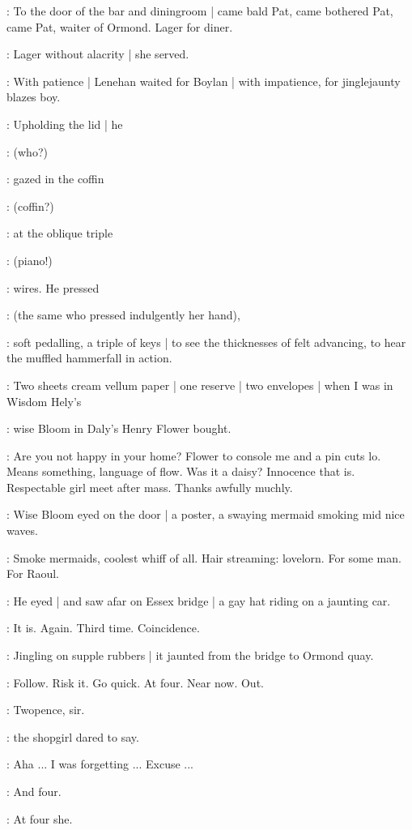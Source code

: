 :
To the door of the bar and diningroom |
came bald Pat,
came bothered Pat,
came Pat,
waiter of Ormond.
Lager for diner.

:
Lager without alacrity |
she served.

:
With patience  |
Lenehan waited for Boylan |
with impatience,
for jinglejaunty
blazes boy.

:
Upholding the lid |
he

:
(who?)

:
gazed in the coffin

:
(coffin?)

:
at the oblique triple

:
(piano!)

:
wires.
He pressed

:
(the same who pressed indulgently her hand),

:
soft pedalling,
a triple of keys |
to see the thicknesses of felt advancing,
to hear the muffled hammerfall in action.

\BloomInt:
Two sheets cream vellum paper |
one reserve |
two envelopes |
when I was
in Wisdom Hely's

:
wise Bloom in Daly's Henry Flower bought.

\BloomInt:
Are you not happy in your home?
Flower to console me and a pin cuts lo.
Means something,
language of flow.
Was it a daisy?
Innocence that is.
Respectable girl meet after mass.
Thanks awfully muchly.

:
Wise Bloom eyed on the door |
a poster,
a swaying mermaid smoking mid nice waves.

\BloomInt:
Smoke mermaids,
coolest whiff of all.
Hair streaming:
lovelorn.
For some man.
For Raoul.

:
He eyed |
and saw afar on Essex bridge |
a gay hat riding on a jaunting car.

\BloomInt:
It is.
Again.
Third time.
Coincidence.

:
Jingling on supple rubbers |
it jaunted from the bridge to Ormond quay.

\BloomInt:
Follow.
Risk it.
Go quick.
At four.
Near now.
Out.

\shopgirl:
Twopence,
sir.

:
the shopgirl dared to say.

\Bloom:
Aha ...
I was forgetting ...
Excuse ...

\shopgirl:
And four.

\BloomInt:
At four she.

